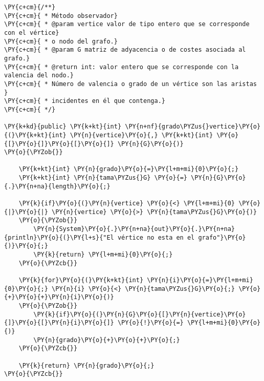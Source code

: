 \begin{Verbatim}[commandchars=\\\{\}]
\PY{c+cm}{/**}
\PY{c+cm}{ * Método observador}
\PY{c+cm}{ * @param vertice valor de tipo entero que se corresponde con el vértice}
\PY{c+cm}{ * o nodo del grafo.}
\PY{c+cm}{ * @param G matriz de adyacencia o de costes asociada al grafo.}
\PY{c+cm}{ * @return int: valor entero que se corresponde con la valencia del nodo.}
\PY{c+cm}{ * Número de valencia o grado de un vértice son las aristas }
\PY{c+cm}{ * incidentes en él que contenga.}
\PY{c+cm}{ */}

\PY{k+kd}{public} \PY{k+kt}{int} \PY{n+nf}{grado\PYZus{}vertice}\PY{o}{(}\PY{k+kt}{int} \PY{n}{vertice}\PY{o}{,} \PY{k+kt}{int} \PY{o}{[}\PY{o}{]}\PY{o}{[}\PY{o}{]} \PY{n}{G}\PY{o}{)}
\PY{o}{\PYZob{}}

    \PY{k+kt}{int} \PY{n}{grado}\PY{o}{=}\PY{l+m+mi}{0}\PY{o}{;}
    \PY{k+kt}{int} \PY{n}{tama\PYZus{}G} \PY{o}{=} \PY{n}{G}\PY{o}{.}\PY{n+na}{length}\PY{o}{;}

    \PY{k}{if}\PY{o}{(}\PY{n}{vertice} \PY{o}{<} \PY{l+m+mi}{0} \PY{o}{|}\PY{o}{|} \PY{n}{vertice} \PY{o}{>} \PY{n}{tama\PYZus{}G}\PY{o}{)}
	\PY{o}{\PYZob{}}
	    \PY{n}{System}\PY{o}{.}\PY{n+na}{out}\PY{o}{.}\PY{n+na}{println}\PY{o}{(}\PY{l+s}{"El vértice no esta en el grafo"}\PY{o}{)}\PY{o}{;}
	    \PY{k}{return} \PY{l+m+mi}{0}\PY{o}{;}
	\PY{o}{\PYZcb{}}

    \PY{k}{for}\PY{o}{(}\PY{k+kt}{int} \PY{n}{i}\PY{o}{=}\PY{l+m+mi}{0}\PY{o}{;} \PY{n}{i} \PY{o}{<} \PY{n}{tama\PYZus{}G}\PY{o}{;} \PY{o}{+}\PY{o}{+}\PY{n}{i}\PY{o}{)}
	\PY{o}{\PYZob{}}
	    \PY{k}{if}\PY{o}{(}\PY{n}{G}\PY{o}{[}\PY{n}{vertice}\PY{o}{]}\PY{o}{[}\PY{n}{i}\PY{o}{]} \PY{o}{!}\PY{o}{=} \PY{l+m+mi}{0}\PY{o}{)}
		\PY{n}{grado}\PY{o}{+}\PY{o}{+}\PY{o}{;}
	\PY{o}{\PYZcb{}}

    \PY{k}{return} \PY{n}{grado}\PY{o}{;}
\PY{o}{\PYZcb{}}
\end{Verbatim}
